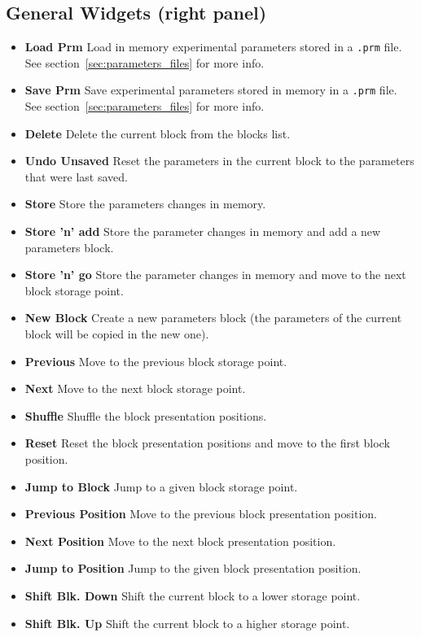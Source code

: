 \subsection{General Widgets (right panel)}
\begin{itemize}
\item \textbf{Load Prm} Load in memory experimental parameters stored in a \texttt{.prm} file. See section~\ref{sec:parameters_files} for more info.
\item \textbf{Save Prm} Save experimental parameters stored in memory in a \texttt{.prm} file. See section~\ref{sec:parameters_files} for more info.
\item \textbf{Delete} Delete the current block from the blocks list.
\item \textbf{Undo Unsaved} Reset the parameters in the current block to the parameters that were last saved.
\item \textbf{Store} Store the parameters changes in memory.
\item \textbf{Store 'n' add} Store the parameter changes in memory and add a new parameters block.
\item \textbf{Store 'n' go} Store the parameter changes in memory and move to the next block storage point.
\item \textbf{New Block} Create a new parameters block (the parameters of the current block will be copied in the new one).
\item \textbf{Previous} Move to the previous block storage point.
\item \textbf{Next} Move to the next block storage point.
\item \textbf{Shuffle} Shuffle the block presentation positions.
\item \textbf{Reset} Reset the block presentation positions and move to the first block position.
\item \textbf{Jump to Block} Jump to a given block storage point.
\item \textbf{Previous Position} Move to the previous block presentation position.
\item \textbf{Next Position} Move to the next block presentation position.
\item \textbf{Jump to Position} Jump to the given block presentation position.
\item \textbf{Shift Blk. Down} Shift the current block to a lower storage point.
\item \textbf{Shift Blk. Up} Shift the current block to a higher storage point.
\end{itemize}


